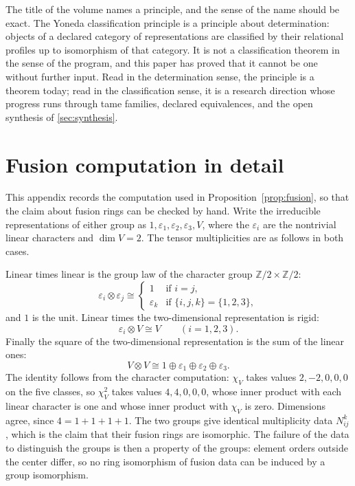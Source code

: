 \documentclass[11pt,letterpaper]{article}
\theoremstyle{definition}
\theoremstyle{remark}
\begin{document}
The title of the volume names a principle, and the sense of the name should be exact. The Yoneda classification principle is a principle about determination: objects of a declared category of representations are classified by their relational profiles up to isomorphism of that category. It is not a classification theorem in the sense of the program, and this paper has proved that it cannot be one without further input. Read in the determination sense, the principle is a theorem today; read in the classification sense, it is a research direction whose progress runs through tame families, declared equivalences, and the open synthesis of \cref{sec:synthesis}.

\appendix
\section{Fusion computation in detail}
\label{sec:fusion-app}

This appendix records the computation used in Proposition~\ref{prop:fusion}, so that the claim about fusion rings can be checked by hand. Write the irreducible representations of either group as $1, \varepsilon_1, \varepsilon_2, \varepsilon_3, V$, where the $\varepsilon_i$ are the nontrivial linear characters and $\dim V = 2$. The tensor multiplicities are as follows in both cases.

Linear times linear is the group law of the character group $\mathbb{Z}/2 \times \mathbb{Z}/2$:
\[
\varepsilon_i \otimes \varepsilon_j \cong
\begin{cases}
1 & \text{if } i = j, \\
\varepsilon_k & \text{if } \{i, j, k\} = \{1, 2, 3\},
\end{cases}
\]
and $1$ is the unit. Linear times the two-dimensional representation is rigid:
\[
\varepsilon_i \otimes V \cong V \qquad (i = 1, 2, 3).
\]
Finally the square of the two-dimensional representation is the sum of the linear ones:
\[
V \otimes V \cong 1 \oplus \varepsilon_1 \oplus \varepsilon_2 \oplus \varepsilon_3.
\]
The identity follows from the character computation: $\chi_V$ takes values $2, -2, 0, 0, 0$ on the five classes, so $\chi_V^2$ takes values $4, 4, 0, 0, 0$, whose inner product with each linear character is one and whose inner product with $\chi_V$ is zero. Dimensions agree, since $4 = 1 + 1 + 1 + 1$. The two groups give identical multiplicity data $N_{ij}^{k}$, which is the claim that their fusion rings are isomorphic. The failure of the data to distinguish the groups is then a property of the groups: element orders outside the center differ, so no ring isomorphism of fusion data can be induced by a group isomorphism.
\end{document}
